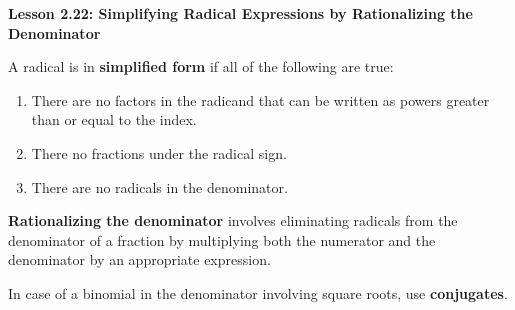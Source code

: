 \begin{center}
\textbf{Lesson 2.22: Simplifying Radical Expressions by Rationalizing the Denominator}
\end{center}

\vspace*{1ex}

A radical is in \textbf{simplified form} if all of the following are true: 

\begin{enumerate}[noitemsep, label = \color{blue}\arabic*. ]
\item There are no factors in the radicand that can be written as powers greater than or equal to the index. 
\item There no fractions under the radical sign.
\item There are no radicals in the denominator.
\end{enumerate}


\textbf{Rationalizing the denominator} involves eliminating radicals from the denominator of a fraction by multiplying both the numerator and the denominator by an appropriate expression.

In case of a binomial in the denominator involving square roots, use \textbf{conjugates}.

   
